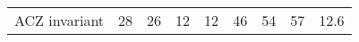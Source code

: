 \begin{table}
\begin{tabular}{|l|c|c|c|c|c|c|c|c|c|}
\hline
\multicolumn{2}{|c|}{\multirow{2}{*}{ACZ invariant}} &
\multirow{2}{*}{28} & \multirow{2}{*}{26} &
\multirow{2}{*}{12} & \multirow{2}{*}{12} &
\multirow{2}{*}{46} & \multirow{2}{*}{54} &
\multirow{2}{*}{57} & \multirow{2}{*}{12.6}\\
\multicolumn{2}{|c|}{} & & & & & & & &\\
\hline
\end{tabular}
%

\end{table}

